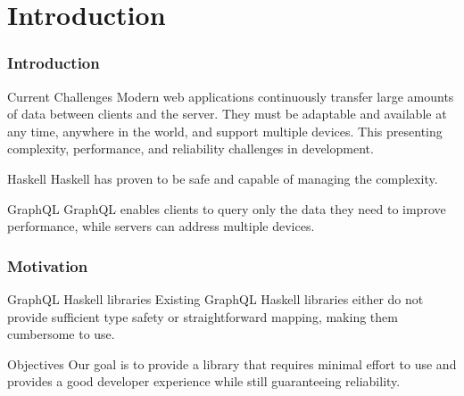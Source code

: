 \section{Introduction}

\begin{frame}\frametitle{Introduction}

    \begin{block}{Current Challenges}
        Modern web applications continuously transfer large amounts of data between clients and the server. They must be adaptable and available at any time, anywhere in the world, and support multiple devices. This presenting complexity, performance, and reliability challenges in development. 
    \end{block}

    \begin{block}{Haskell} Haskell has proven to be safe and capable of managing the complexity. 
    \end{block}

    \begin{block}{GraphQL} GraphQL enables clients to query only the data they need to improve performance, while servers can address multiple devices.
    \end{block}

\end{frame}

\begin{frame}\frametitle{Motivation}

\begin{block}{GraphQL Haskell libraries}
    Existing GraphQL Haskell libraries either do not provide sufficient type safety or straightforward mapping, making them cumbersome to use.
\end{block}

\begin{block}{Objectives}
Our goal is to provide a library that requires minimal effort to use and provides a good developer experience while still guaranteeing reliability.
\end{block}

\end{frame}